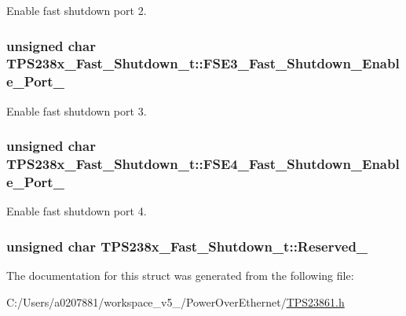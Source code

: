 Enable fast shutdown port 2. 

\hypertarget{struct_t_p_s238x___fast___shutdown__t_abeaad9c31580ae51686bb095700fdb25}{
\subsubsection[{F\-S\-E3\-\_\-\-Fast\-\_\-\-Shutdown\-\_\-\-Enable\-\_\-\-Port\-\_\-3}]{\setlength{\rightskip}{0pt plus 5cm}unsigned char T\-P\-S238x\-\_\-\-Fast\-\_\-\-Shutdown\-\_\-t\-::\-F\-S\-E3\-\_\-\-Fast\-\_\-\-Shutdown\-\_\-\-Enable\-\_\-\-Port\-\_}}\label{struct_t_p_s238x___fast___shutdown__t_abeaad9c31580ae51686bb095700fdb25}


Enable fast shutdown port 3. 

\hypertarget{struct_t_p_s238x___fast___shutdown__t_ae226b67ecda7b0c8a433816d97e99cf8}{
\subsubsection[{F\-S\-E4\-\_\-\-Fast\-\_\-\-Shutdown\-\_\-\-Enable\-\_\-\-Port\-\_\-4}]{\setlength{\rightskip}{0pt plus 5cm}unsigned char T\-P\-S238x\-\_\-\-Fast\-\_\-\-Shutdown\-\_\-t\-::\-F\-S\-E4\-\_\-\-Fast\-\_\-\-Shutdown\-\_\-\-Enable\-\_\-\-Port\-\_}}\label{struct_t_p_s238x___fast___shutdown__t_ae226b67ecda7b0c8a433816d97e99cf8}


Enable fast shutdown port 4. 

\hypertarget{struct_t_p_s238x___fast___shutdown__t_a7afb7052704127db4a805138745e1d34}{
\subsubsection[{Reserved\-\_\-4}]{\setlength{\rightskip}{0pt plus 5cm}unsigned char T\-P\-S238x\-\_\-\-Fast\-\_\-\-Shutdown\-\_\-t\-::\-Reserved\-\_}}\label{struct_t_p_s238x___fast___shutdown__t_a7afb7052704127db4a805138745e1d34}


The documentation for this struct was generated from the following file\-:\begin{DoxyCompactItemize}
\item 
C\-:/\-Users/a0207881/workspace\-\_\-v5\-\_/\-Power\-Over\-Ethernet/\hyperlink{_t_p_s23861_8h}{T\-P\-S23861.\-h}\end{DoxyCompactItemize}

